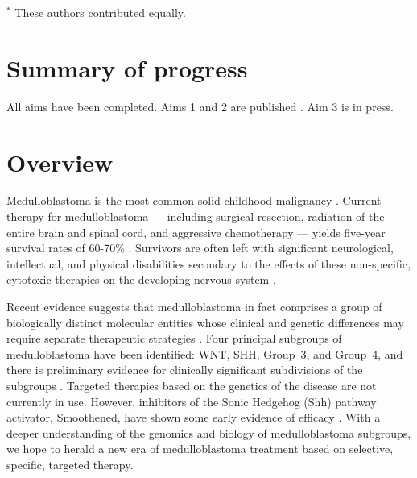 \documentclass[11pt,letterpaper]{article}
\theoremstyle{definition}
\begin{document}


\clearpage

\bigskip
$^*$ These authors contributed equally.

\clearpage


\clearpage

\section{Summary of progress}


All aims have been completed. Aims 1 and 2 are published . Aim 3 is in press.


\section{Overview}

Medulloblastoma is the most common solid childhood malignancy . Current therapy for medulloblastoma --- including surgical resection, radiation of the entire brain and spinal cord, and aggressive chemotherapy --- yields five-year survival rates of 60-70\% . Survivors are often left with significant neurological, intellectual, and physical disabilities secondary to the effects of these non-specific, cytotoxic therapies on the developing nervous system .

Recent evidence suggests that medulloblastoma in fact comprises a group of biologically distinct molecular entities whose clinical and genetic differences may require separate therapeutic strategies . Four principal subgroups of medulloblastoma have been identified: WNT, SHH, Group~3, and Group~4, and there is preliminary evidence for clinically significant subdivisions of the subgroups . Targeted therapies based on the genetics of the disease are not currently in use. However, inhibitors of the Sonic Hedgehog (Shh) pathway activator, Smoothened, have shown some early evidence of efficacy . With a deeper understanding of the genomics and biology of medulloblastoma subgroups, we hope to herald a new era of medulloblastoma treatment based on selective, specific, targeted therapy.
\end{document}
